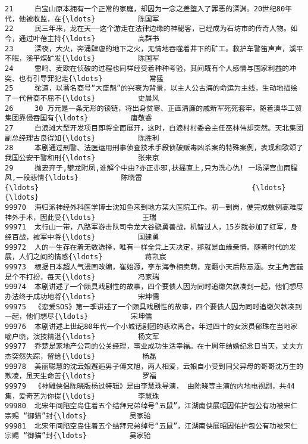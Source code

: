 \documentclass[11pt]{article}
\begin{document}
\begin{Verbatim}[commandchars=\\\{\}]
21     白宝山原本拥有一个正常的家庭，却因为一念之差堕入了罪恶的深渊。20世纪80年代，他被收监，在{\ldots}          陈国军   
22     民三年来，龙在天——这个游走在法律边缘的神秘客，已经成为石坊市的传奇人物。如今，通过叶蓓主持{\ldots}          高群书   
23     深夜，大火，奔涌肆虐的地下之火，无情地吞噬着井下的矿工。救护车警笛声声，溪平不眠，溪平煤矿发{\ldots}          陈国军   
24     雷鸣、麦欧在侦破的过程也同样经受着种种考验，其间既有个人感情与国家利益的冲突、也有引导罪犯走{\ldots}           常猛   
25     驼道，以著名商号“大盛魁”的兴衰为背景，以主人公古海的命运为主线，生动地描绘了一代晋商不屈不{\ldots}          史晨风   
26     30 万元是一条无形的锁链，将出身贫寒、正直清廉的戚新军死死套牢。随着澳华工贸集团靠侵吞国有{\ldots}          唐敬睿   
27     白浪滩大型开发项目即将全面展开，这时，白浪村村委会主任巫林伟却突然。天北集团副总经理古良得知{\ldots}          陈胜利   
28     本剧通过刑警、法医运用刑事侦查技术手段侦破贩毒凶杀案的特殊案例，表现和歌颂了我国公安干警和刑{\ldots}          张来京   
29     抛妻弃子,攀龙附凤,谁解个中由?亦正亦邪,扶摇直上,只为洗心仇! 一场深宫血雨腥风,一段悲情{\ldots}          陈晓雷   
{\ldots}                                                  {\ldots}          {\ldots}   
99970  海归派神经外科医学博士沈知鱼来到地方某大医院工作。初一到岗，便完成数例高难度神外手术，因此受{\ldots}           王瑞   
99971  太行山一带，八路军游击队司令龙大谷骁勇善战，机智过人，15岁就参加了红军，身经百战，被军中将{\ldots}          国建勇   
99972  人的一生存在着无数选择，唯有一样全凭上天决定，那就是血缘亲情。随着时代的发展，人们之间的情感{\ldots}          蒋凯宸   
99973  根据日本超人气漫画改编，崔始源，李东海争相卖萌，宠翻小天后陈意涵。女主角宫囍是个不打扮，每天{\ldots}          冯家瑞   
99974  本剧讲述了一个颇具戏剧性的故事，四个要债人因为同时追缴欠款凑到一起，他们想尽办法终于成功地将{\ldots}          宋坤儒   
99975  《恋爱SOS》第一季讲述了一个颇具戏剧性的故事，四个要债人因为同时追缴欠款凑到一起，他们想尽{\ldots}          宋坤儒   
99976  本剧讲述上世纪80年代一个小城话剧团的悲欢离合。年过四十的女演员郁珠在当地家喻户晓，演技精湛{\ldots}          杨文军   
99977  乔楚是家地产公司的公关经理，事业成功生活幸福。在十周年结婚纪念日当天，丈夫方杰突然失踪，留给{\ldots}           杨磊   
99978  美丽聪慧的沈云娘邂逅男子傅文旭，两人相爱，云娘自小受到同父异母的哥哥沈万生的欺凌，虽天生命苦{\ldots}           罗福   
99979  《神雕侠侣陈晓版杨过特辑》是由李慧珠导演， 由陈晓等主演的内地电视剧，共44集，爱奇艺为你提{\ldots}          李慧珠   
99980  北宋年间陷空岛住着五个结拜兄弟绰号“五鼠”，江湖南侠展昭因佑护包公有功被宋仁宗赐 “御猫”封{\ldots}          吴家骀   
99981  北宋年间陷空岛住着五个结拜兄弟绰号“五鼠”，江湖南侠展昭因佑护包公有功被宋仁宗赐 “御猫”封{\ldots}          吴家骀   

\end{Verbatim}
\end{document}

